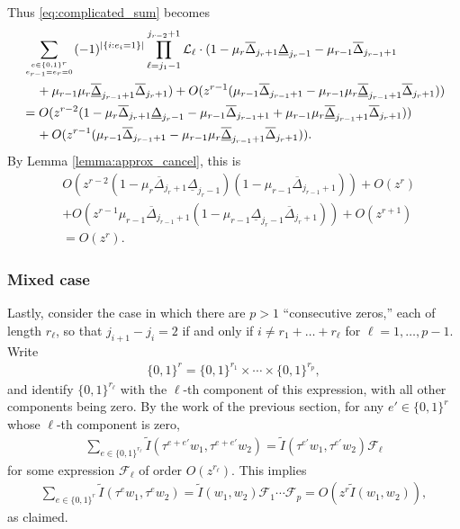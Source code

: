 \documentclass[11pt]{amsart}
\numberwithin{theorem}{section}
\numberwithin{equation}{section}
\theoremstyle{remark}
\theoremstyle{definition}
\begin{document}
Thus \eqref{eq:complicated_sum} becomes
\begin{align*}
&\sum_{e\in\{0,1\}^r \atop e_{r-1}=e_r=0} (-1)^{|\{i:e_i=1\}|} \prod_{\ell=j_1-1}^{j_{r-2}+1}\mathcal L_\ell \cdot (1-\mu_r\overline{\Delta}_{j_r+1}\underline{\Delta}_{j_r-1} -\mu_{r-1}\overline{\Delta}_{j_{r-1}+1} \\
&\hspace{4mm}+\mu_{r-1}\mu_r\overline{\underline{\Delta}}_{j_{r-1}+1}\overline{\Delta}_{j_r+1})
+ O(z^{r-1}(\mu_{r-1}\overline{\Delta}_{j_{r-1}+1} - \mu_{r-1}\mu_r\overline{\underline{\Delta}}_{j_{r-1}+1}\overline{\Delta}_{j_r+1})) \\
&=O(z^{r-2}(1-\mu_r\overline{\Delta}_{j_r+1}\underline{\Delta}_{j_r-1} -\mu_{r-1}\overline{\Delta}_{j_{r-1}+1} + \mu_{r-1}\mu_r\overline{\underline{\Delta}}_{j_{r-1}+1}\overline{\Delta}_{j_r+1})) \\
&\hspace{4mm}+ O(z^{r-1}(\mu_{r-1}\overline{\Delta}_{j_{r-1}+1} - \mu_{r-1}\mu_r\overline{\underline{\Delta}}_{j_{r-1}+1}\overline{\Delta}_{j_r+1})).
\end{align*}
By Lemma \ref{lemma:approx_cancel}, this is
\begin{align*}
&O(z^{r-2}(1-\mu_r\overline{\Delta}_{j_r+1}\underline{\Delta}_{j_r-1})(1-\mu_{r-1}\overline{\Delta}_{j_{r-1}+1})) + O(z^r) \\
&+O(z^{r-1}\mu_{r-1}\overline{\Delta}_{j_{r-1}+1}(1-\mu_{r-1}\underline{\Delta}_{j_r-1}\overline{\Delta}_{j_r+1} ))+O(z^{r+1}) \\
&=O(z^r).
\end{align*}

\subsubsection{Mixed case}

Lastly, consider the case in which there are $p > 1$ ``consecutive zeros,'' each of length $r_\ell$, so that $j_{i+1}-j_i = 2$ if and only if $i \neq r_1 + \ldots + r_{\ell}$ for $\ell=1,\ldots,p-1$. Write
\begin{align*}
\{0,1\}^r = \{0,1\}^{r_1} \times \cdots \times \{0,1\}^{r_p},
\end{align*}
and identify $\{0,1\}^{r_\ell}$ with the $\ell$-th component of this expression, with all other components being zero. By the work of the previous section, for any $e' \in \{0,1\}^r$ whose $\ell$-th component is zero,
\begin{align*}
\sum_{e \in \{0,1\}^{r_\ell}}\tilde I(\tau^{e+e'}w_1,\tau^{e+e'}w_2) = \tilde I(\tau^{e'}w_1,\tau^{e'}w_2)\mathcal F_\ell 
\end{align*}
for some expression $\mathcal F_\ell$ of order $O(z^{r_\ell})$. This implies
\begin{align*}
\sum_{e \in \{0,1\}^{r}}\tilde I(\tau^{e}w_1,\tau^{e}w_2) = \tilde I(w_1,w_2)\mathcal F_1\cdots\mathcal F_p = O(z^r\tilde I(w_1,w_2)),
\end{align*}
as claimed.
\end{document}
